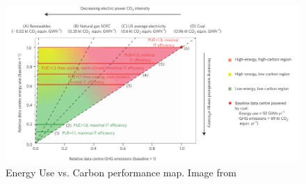 \begin{figure} [!h]
\centering
\includegraphics[scale=.25]{methodology/images/masanet13a1.eps}
\caption[Energy Use vs. Carbon performance map]{Energy Use vs. Carbon performance map. Image from \cite{Masanet13a}}
\label{masanet13a1}
\end{figure}